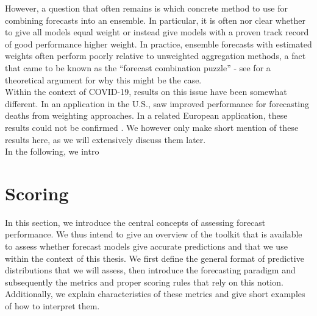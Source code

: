 However, a question that often remains is which concrete method to use for combining forecasts into an ensemble. In particular, it is often nor clear whether to give all models equal weight or instead give models with a proven track record of good performance higher weight. In practice, ensemble forecasts with estimated weights often perform poorly relative to unweighted aggregation methods, a fact that came to be known as the ``forecast combination puzzle'' - see \cite{claeskens_forecast_2016} for a theoretical argument for why this might be the case.\\
Within the context of COVID-19, results on this issue have been somewhat different. In an application in the U.S., \cite{ray_comparing_2022} saw improved performance for forecasting deaths from weighting approaches. In a related European application, these results could not be confirmed \citep{sherratt_european_2022}. We however only make short mention of these results here, as we will extensively discuss them later. \medskip\\
In the following, we intro
\newpage
\section{Scoring}
In this section, we introduce the central concepts of assessing forecast performance. We thus intend to give an overview of the toolkit that is available to assess whether forecast models give accurate predictions and that we use within the context of this thesis. We first define the general format of predictive distributions that we will assess, then introduce the forecasting paradigm and subsequently the metrics and proper scoring rules that rely on this notion. Additionally, we explain characteristics of these metrics and give short examples of how to interpret them.\\ 
